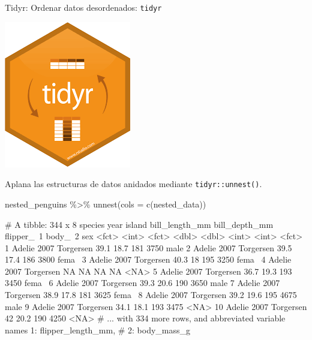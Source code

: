 \documentclass[
  ignorenonframetext,
  aspectratio=169]{beamer}
\newenvironment{Shaded}{\begin{snugshade}}{\end{snugshade}}
\newcommand{\AttributeTok}[1]{\textcolor[rgb]{0.77,0.63,0.00}{#1}}
\newcommand{\FunctionTok}[1]{\textcolor[rgb]{0.00,0.00,0.00}{#1}}
\newcommand{\NormalTok}[1]{#1}
\newcommand{\SpecialCharTok}[1]{\textcolor[rgb]{0.00,0.00,0.00}{#1}}
\let\oldverbatim\verbatim
\let\endoldverbatim\endverbatim
\renewenvironment{verbatim}{\tiny\oldverbatim}{\endoldverbatim}
\begin{document}
\begin{frame}[fragile]{Tidyr: Ordenar datos desordenados:
\texttt{tidyr}}
\protect\hypertarget{tidyr-ordenar-datos-desordenados-tidyr-5}{}
\begin{flushright}\includegraphics[width=0.05\linewidth]{Imgs/logo_tidyr} \end{flushright}

Aplana las estructuras de datos anidados mediante
\texttt{tidyr::unnest()}.

\begin{Shaded}
\begin{Highlighting}[]
\NormalTok{nested\_penguins }\SpecialCharTok{\%\textgreater{}\%} \FunctionTok{unnest}\NormalTok{(}\AttributeTok{cols =} \FunctionTok{c}\NormalTok{(nested\_data)) }
\end{Highlighting}
\end{Shaded}

\begin{verbatim}
# A tibble: 344 x 8
   species  year island    bill_length_mm bill_depth_mm flipper_~1 body_~2 sex  
   <fct>   <int> <fct>              <dbl>         <dbl>      <int>   <int> <fct>
 1 Adelie   2007 Torgersen           39.1          18.7        181    3750 male 
 2 Adelie   2007 Torgersen           39.5          17.4        186    3800 fema~
 3 Adelie   2007 Torgersen           40.3          18          195    3250 fema~
 4 Adelie   2007 Torgersen           NA            NA           NA      NA <NA> 
 5 Adelie   2007 Torgersen           36.7          19.3        193    3450 fema~
 6 Adelie   2007 Torgersen           39.3          20.6        190    3650 male 
 7 Adelie   2007 Torgersen           38.9          17.8        181    3625 fema~
 8 Adelie   2007 Torgersen           39.2          19.6        195    4675 male 
 9 Adelie   2007 Torgersen           34.1          18.1        193    3475 <NA> 
10 Adelie   2007 Torgersen           42            20.2        190    4250 <NA> 
# ... with 334 more rows, and abbreviated variable names 1: flipper_length_mm,
#   2: body_mass_g
\end{verbatim}
\end{frame}
\end{document}
